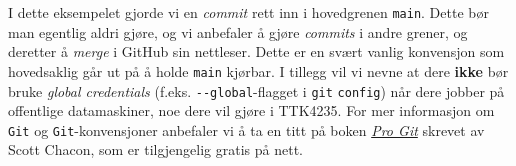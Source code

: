 I dette eksempelet gjorde vi en \textit{commit} rett inn i hovedgrenen \verb|main|. Dette bør man egentlig aldri gjøre, og vi anbefaler å gjøre \textit{commits} i andre grener, og deretter å \textit{merge} i GitHub sin nettleser. Dette er en svært vanlig konvensjon som hovedsaklig går ut på å holde \verb|main| kjørbar. I tillegg vil vi nevne at dere {\bf{ikke}} bør bruke \textit{global credentials} (f.eks. \verb|--global|-flagget i \verb|git| \verb|config|) når dere jobber på offentlige datamaskiner, noe dere vil gjøre i TTK4235. For mer informasjon om \verb|Git| og \verb|Git|-konvensjoner anbefaler vi å ta en titt på boken \href{https://git-scm.com/book/en/v2}{\it Pro Git} skrevet av Scott Chacon, som er tilgjengelig gratis på nett.







